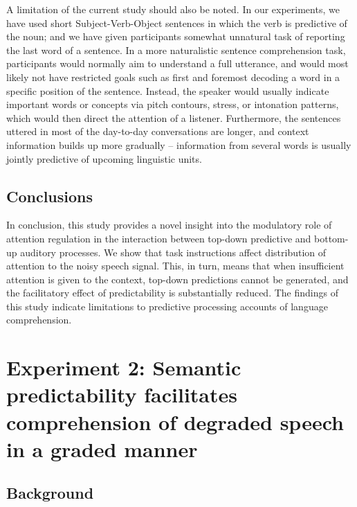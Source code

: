 \documentclass[a4paper, nobind]{templates/ociamthesis}
\begin{document}
A limitation of the current study should also be noted.
In our experiments, we have used short Subject-Verb-Object sentences in which the verb is predictive of the noun; and we have given participants somewhat unnatural task of reporting the last word of a sentence.
In a more naturalistic sentence comprehension task, participants would normally aim to understand a full utterance, and would most likely not have restricted goals such as first and foremost decoding a word in a specific position of the sentence.
Instead, the speaker would usually indicate important words or concepts via pitch contours, stress, or intonation patterns, which would then direct the attention of a listener.
Furthermore, the sentences uttered in most of the day-to-day conversations are longer, and context information builds up more gradually -- information from several words is usually jointly predictive of upcoming linguistic units.

\hypertarget{conclusions}{%
\section{Conclusions}\label{conclusions}}

In conclusion, this study provides a novel insight into the modulatory role of attention regulation in the interaction between top-down predictive and bottom-up auditory processes.
We show that task instructions affect distribution of attention to the noisy speech signal.
This, in turn, means that when insufficient attention is given to the context, top-down predictions cannot be generated, and the facilitatory effect of predictability is substantially reduced.
The findings of this study indicate limitations to predictive processing accounts of language comprehension.

\hypertarget{experiment-2-semantic-predictability-facilitates-comprehension-of-degraded-speech-in-a-graded-manner}{%
\chapter{Experiment 2: Semantic predictability facilitates comprehension of degraded speech in a graded manner}\label{experiment-2-semantic-predictability-facilitates-comprehension-of-degraded-speech-in-a-graded-manner}}

\minitoc

\hypertarget{background-1}{%
\section{Background}\label{background-1}}
\end{document}
